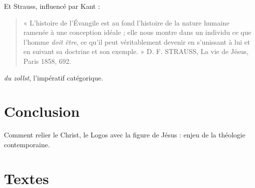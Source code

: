 Et Strauss, influencé par Kant : 
\begin{quote}
« L’histoire de l’Évangile est au fond l’histoire de la nature humaine ramenée à une
conception idéale ; elle nous montre dans un individu ce que l’homme \textit{doit être}, ce qu’il peut
véritablement devenir en s’unissant à lui et en suivant sa doctrine et son exemple. » D. F.
STRAUSS, La vie de Jésus, Paris 1858, 692.
    
\end{quote}
\textit{du zollst}, l'impératif catégorique. 







\section{Conclusion}

Comment relier le Christ, le Logos avec la figure de Jésus : enjeu de la théologie contemporaine.



\section{Textes}
















 